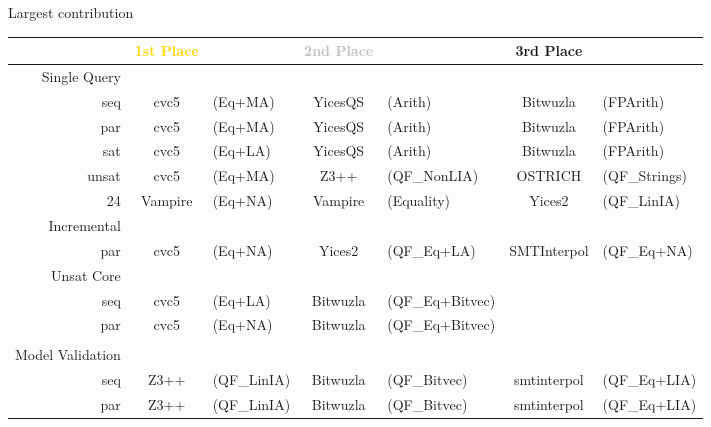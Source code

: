 \documentclass[table]{beamer}
\def\emph#1{\textcolor{MYblue}{#1}}
\begin{document}
\begin{frame}{Largest contribution}
  \begin{tabular}{r|c@{}lc@{}lc@{}l}
    &\textcolor{gold}{\textbf{1st Place}} &&
    \textcolor{silver}{\textbf{2nd Place}} &&
    \textcolor{bronze}{\textbf{3rd Place}}\\
    \hline
    \emph{Single Query}\\
    seq & cvc5&{\tiny(Eq+MA)} & YicesQS&{\tiny(Arith)} & Bitwuzla&{\tiny(FPArith)} \\
    par & cvc5&{\tiny(Eq+MA)} & YicesQS&{\tiny(Arith)} & Bitwuzla&{\tiny(FPArith)} \\
    sat & cvc5&{\tiny(Eq+LA)} & YicesQS&{\tiny(Arith)} & Bitwuzla&{\tiny(FPArith)} \\
    unsat & cvc5&{\tiny(Eq+MA)} & Z3++&{\tiny(QF\_NonLIA)} & OSTRICH&{\tiny(QF\_Strings)}\\
    24 &  Vampire&{\tiny(Eq+NA)} & Vampire&{\tiny(Equality)} & Yices2&{\tiny(QF\_LinIA)}\\[3pt]
    \pause
    \emph{Incremental}\\
    par & cvc5&{\tiny(Eq+NA)} &Yices2&{\tiny(QF\_Eq+LA)}
    &SMTInterpol&{\tiny(QF\_Eq+NA)}\\[3pt]
    \pause

    \emph{Unsat Core}\\
    seq & cvc5&{\tiny(Eq+LA)} &
    Bitwuzla&{\tiny(QF\_Eq+Bitvec)}\\

    par &  cvc5&{\tiny(Eq+NA)}&
    Bitwuzla&{\tiny(QF\_Eq+Bitvec)}\\
\\[3pt]
    \pause
    \emph{Model Validation}\\
    seq &  Z3++&{\tiny(QF\_LinIA)} & Bitwuzla&{\tiny(QF\_Bitvec)}
        & smtinterpol&{\tiny(QF\_Eq+LIA)}\\
    par &  Z3++&{\tiny(QF\_LinIA)} & Bitwuzla&{\tiny(QF\_Bitvec)}
        & smtinterpol&{\tiny(QF\_Eq+LIA)}\\
  \end{tabular}
\end{frame}
\end{document}
